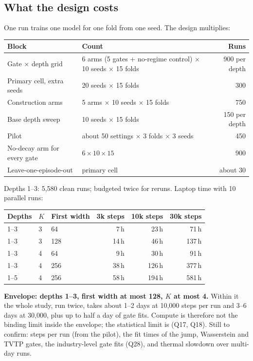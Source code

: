 \subsection{What the design costs}

One run trains one model for one fold from one seed. The design multiplies:

{\small
\begin{tabularx}{\textwidth}{@{}X X r@{}}
\toprule
Block & Count & Runs\\
\midrule
Gate $\times$ depth grid & 6 arms (5 gates + no-regime control) $\times$ 10 seeds $\times$ 15 folds & 900 per depth\\
Primary cell, extra seeds & 20 seeds $\times$ 15 folds & 300\\
Construction arms & 5 arms $\times$ 10 seeds $\times$ 15 folds & 750\\
Base depth sweep & 10 seeds $\times$ 15 folds & 150 per depth\\
Pilot & about 50 settings $\times$ 3 folds $\times$ 3 seeds & 450\\
No-decay arm for every gate & $6\times10\times15$ & 900\\
Leave-one-episode-out & primary cell & about 30\\
\bottomrule
\end{tabularx}}

Depths 1--3: 5,580 clean runs; budgeted twice for reruns. Laptop time with 10 parallel runs:

{\small
\begin{tabular}{@{}lllrrr@{}}
\toprule
Depths & $K$ & First width & 3k steps & 10k steps & 30k steps\\
\midrule
1--3 & 3 & 64 & 7\,h & 23\,h & 71\,h\\
1--3 & 3 & 128 & 14\,h & 46\,h & 137\,h\\
1--3 & 4 & 64 & 9\,h & 30\,h & 91\,h\\
1--3 & 4 & 256 & 38\,h & 126\,h & 377\,h\\
1--5 & 4 & 256 & 58\,h & 194\,h & 581\,h\\
\bottomrule
\end{tabular}}

 \textbf{Envelope: depths 1--3, first width at most 128, $K$ at most 4.} Within it the whole
study, run twice, takes about 1--2 days at 10,000 steps per run and 3--6 days at 30,000, plus up to half
a day of gate fits. Compute is therefore not the binding limit inside the envelope; the statistical
limit is (Q17, Q18). Still to confirm: steps per run (from the pilot), the fit times of the jump,
Wasserstein and TVTP gates, the industry-level gate fits (Q28), and thermal slowdown over multi-day
runs.

